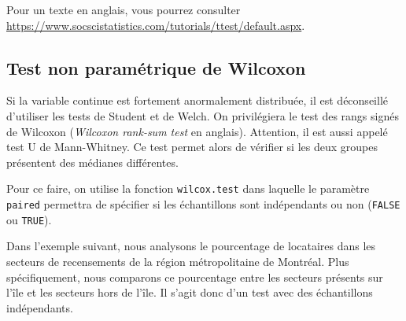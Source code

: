 \documentclass[
  11pt,
  french,
]{book}
\makeatletter
\newenvironment{kframev}{%
\medskip{}
\setlength{\fboxsep}{.8em}
 \def\at@end@of@kframev{}%
 \ifinner\ifhmode%
  \def\at@end@of@kframev{\end{minipage}}%
  \begin{minipage}{\columnwidth}%
 \fi\fi%
 \def\FrameCommand##1{\hskip\@totalleftmargin \hskip-\fboxsep
 \colorbox{shadebluecolor}{##1}\hskip-\fboxsep
     \hskip-\linewidth \hskip-\@totalleftmargin \hskip\columnwidth}%
 \MakeFramed {\advance\hsize-\width
   \@totalleftmargin\z@ \linewidth\hsize
   \@setminipage}}%
 {\par\unskip\endMakeFramed%
 \at@end@of@kframev}
\newenvironment{rmdblock}[1]
  {
  \begin{itemize}
  \renewcommand{\labelitemi}{
    \raisebox{-.7\height}[0pt][0pt]{
      {\setkeys{Gin}{width=3em,keepaspectratio}\texttt{[image: images/\#1]}}
    }
  }
  \setlength{\fboxsep}{1em}
  \begin{kframev}
  \small
  \item
  }
  {
  \end{kframev}
  \end{itemize}
  }
\newenvironment{bloc_objectif}
  {\begin{rmdblock}{objectif}}
  {\end{rmdblock}}
\makeatother
\begin{document}
Pour un texte en anglais, vous pourrez consulter
\url{https://www.socscistatistics.com/tutorials/ttest/default.aspx}.

\hypertarget{sect0432}{%
\subsection{Test non paramétrique de Wilcoxon}\label{sect0432}}

\begin{bloc_objectif}

Si la variable continue est fortement anormalement distribuée, il est déconseillé d'utiliser les tests de Student et de Welch. On privilégiera le test des rangs signés de Wilcoxon (\emph{Wilcoxon rank-sum test} en anglais). Attention, il est aussi appelé test U de Mann-Whitney. Ce test permet alors de vérifier si les deux groupes présentent des médianes différentes.

Pour ce faire, on utilise la fonction \texttt{wilcox.test} dans laquelle le paramètre \texttt{paired} permettra de spécifier si les échantillons sont indépendants ou non (\texttt{FALSE} ou \texttt{TRUE}).

\end{bloc_objectif}

Dans l'exemple suivant, nous analysons le pourcentage de locataires dans les secteurs de recensements de la région métropolitaine de Montréal. Plus spécifiquement, nous comparons ce pourcentage entre les secteurs présents sur l'île et les secteurs hors de l'île. Il s'agit donc d'un test avec des échantillons indépendants.
\end{document}
